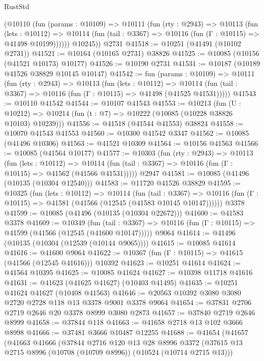 \begin{lexlean}{RustStd}
\begin{coremodule}
        (@10110
          (fun (params : @10109) =>
          @10111
            (fun (rty : @2943) =>
            @10113
              (fun (lets : @10112) =>
              @10114 (fun (tail : @3367) => @10116 (fun (Γ : @10115) => @41498 @10199))))))
        @10245))
    @2731
@41518 := @10251 (@41491 (@10102 @2731))
@41521 := @10164 (@10165 @2731) @38826
@41525 := @10085 (@10156 (@41521 @10173) @10177)
@41526 := @10190 @2731
@41531 := @10187 (@10189 @41526 @38829 @10145 @10147)
@41542 := fun (params : @10109) =>
  @10111
    (fun (rty : @2943) =>
    @10113
      (fun (lets : @10112) =>
      @10114 (fun (tail : @3367) => @10116 (fun (Γ : @10115) => @41498 (@41525 @41531)))))
@41543 := @10110 @41542
@41544 := @10107 @41543
@41553 := @10213
    (fun (U : @10212) => @10214 (fun (t : @7) => @10222 (@10085 (@10228 @38826 @10103) @10239)))
@41556 := @41518 (@41544 @41553) @38824
@41558 := @10070 @41543 @41553
@41560 := @10300 @41542 @3347
@41562 := @10085 (@41496 @10306)
@41563 := @41521 @10309
@41564 := @10156 @41563
@41566 := @10085 (@41564 @10177)
@41577 := @10303
    (fun (rty : @2943) =>
    @10113
      (fun (lets : @10112) =>
      @10114 (fun (tail : @3367) => @10116 (fun (Γ : @10115) => @41562 (@41566 @41531)))))
    @2947
@41581 := @10085 (@41496 (@10135 (@10304 @12540)))
@41583 := @11720 @41526 @38829
@41595 := @10325
    (fun (lets : @10112) =>
    @10114
      (fun (tail : @3367) =>
      @10116 (fun (Γ : @10115) => @41581 (@41566 (@12545 (@41583 @10145 @10147))))))
    @3378
@41599 := @10085 (@41496 (@10135 (@10304 @22672)))
@41600 := @41583 @3378
@41609 := @10349
    (fun (tail : @3367) => @10116 (fun (Γ : @10115) => @41599 (@41566 (@12545 (@41600 @10147)))))
    @9064
@41614 := @41496 (@10135 (@10304 (@12539 (@10144 @9065))))
@41615 := @10085 @41614
@41616 := @41600 @9064
@41622 := @10367 (fun (Γ : @10115) => @41615 (@41566 (@12545 @41616))) @10392
@41623 := @10251 @41614
@41624 := @41564 @10395
@41625 := @10085 @41624
@41627 := @10398 @11718 @41616
@41631 := @41623 (@41625 @41627) (@10403 @41495)
@41635 := @10251 @41624 @41627 (@10408 @41563)
@41646 := @20563 @10392 @3080 @3080 @2720 @2728 @118 @13 @3378 @9001 @3378 @9064
@41654 := @37831 @2706 @2719 @2646 @20 @3378 @8999 @3080 @2873
@41657 := @37840 @2719 @2646 @8999
@41658 := @37844 @118
@41663 := @41658 @2718 @13 @102 @3666 @8998
@41666 := @37481 @3666 @10487 @12255
@41688 := @41654
    (@41657
      (@41663
        @41666
        (@37844
          @2716
          @120
          @13
          @28
          @8996
          @3372
          (@37615 @13 @2715 @8996 (@10708 (@10709 @8996)) (@10524 (@10714 @2715 @13)))

\end{coremodule}
\end{lexlean}
